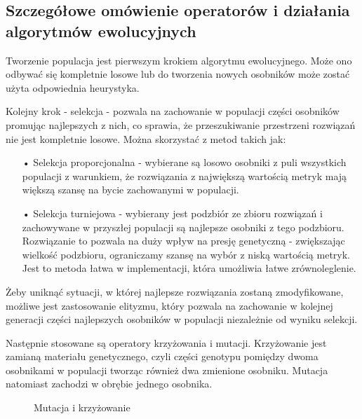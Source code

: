 \subsection{Szczegółowe omówienie operatorów i działania algorytmów ewolucyjnych}
Tworzenie populacja jest pierwszym krokiem algorytmu ewolucyjnego. Może ono odbywać się kompletnie losowe lub do tworzenia nowych osobników może zostać użyta odpowiednia heurystyka. 

Kolejny krok - selekcja - pozwala na zachowanie w populacji części osobników promując najlepszych z nich, co sprawia, że przeszukiwanie przestrzeni rozwiązań nie jest kompletnie losowe. Można skorzystać z metod takich jak:
\begin{itemize}
  \item[•] Selekcja proporcjonalna - wybierane są losowo osobniki z puli wszystkich populacji z warunkiem, że rozwiązania z największą wartością metryk mają większą szansę na bycie zachowanymi w populacji. 
  \item[•] Selekcja turniejowa - wybierany jest podzbiór ze zbioru rozwiązań i zachowywane w przyszłej populacji są najlepsze osobniki z tego podzbioru. Rozwiązanie to pozwala na duży wpływ na presję genetyczną - zwiększając wielkość podzbioru, ograniczamy szansę na wybór z niską wartością metryk. Jest to metoda łatwa w implementacji, która umożliwia łatwe zrównoleglenie.
\end{itemize}

Żeby uniknąć sytuacji, w której najlepsze rozwiązania zostaną zmodyfikowane, możliwe jest zastosowanie elityzmu, który pozwala na zachowanie w kolejnej generacji części najlepszych osobników w populacji niezależnie od wyniku selekcji.

Następnie stosowane są operatory krzyżowania i mutacji. Krzyżowanie jest zamianą materiału genetycznego, czyli części genotypu pomiędzy dwoma osobnikami w populacji tworząc również dwa zmienione osobniku. Mutacja natomiast zachodzi w obrębie jednego osobnika.

\begin{figure}[h]
	\caption{\label{fig:mutation-and-crossover-operations}Mutacja i krzyżowanie}
\end{figure}

